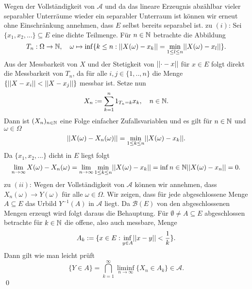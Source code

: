 \begin{proof*}
    Wegen der Vollständigkeit von $\mathcal{A}$ und da das lineare Erzeugnis abzählbar vieler separabler Unterräume wieder ein separabler Unterraum ist können wir erneut ohne Einschränkung annehmen, dass $E$ selbst bereits separabel ist.
    \newline 
    zu $(i)$:
    Sei $\{x_1,x_2,... \} \subseteq E$ eine dichte Teilmenge. Für $n \in \mathbb{N}$ betrachte die Abbildung
    $$
        T_n: \Omega \to \mathbb{N}, \quad \omega \mapsto \inf\{k \leq n: \lvert\lvert X(\omega)-x_k \rvert\rvert = \min_{1\leq l \leq n}\lvert\lvert X(\omega)-x_l \rvert\rvert\}.
    $$ 
    Aus der Messbarkeit von $X$ und der Stetigkeit von $\lvert\lvert \cdot - x \rvert\rvert$ für $x \in E$ folgt direkt die Messbarkeit von $T_n$,
    da für alle $i,j \in \{1,..,n\}$ die Menge $\{\lvert\lvert X - x_i \rvert\rvert < \lvert\lvert X - x_j \rvert\rvert\}$ messbar ist. Setze nun
    $$
        X_n := \sum_{k=1}^n 1_{T_n = k}x_k, \quad n \in \mathbb{N}.
    $$
    Dann ist $(X_n)_{n \in \mathbb{N}}$ eine Folge einfacher Zufallsvariablen und es gilt für $n \in \mathbb{N}$ und $\omega \in \Omega$
    $$
        \lvert\lvert X(\omega)-X_n(\omega) \rvert\rvert = \min_{1\leq k \leq n}\lvert\lvert X(\omega)-x_k \rvert\rvert.
    $$
    Da $\{x_1,x_2,...\}$ dicht in $E$ liegt folgt 
    $$
        \lim_{n \to \infty}{X(\omega) - X_n(\omega)} = \lim_{n \to \infty}\min_{1\leq k \leq n}\lvert\lvert X(\omega)- x_k \rvert\rvert = \inf{n \in \mathbb{N}} \lvert\lvert X(\omega)- x_n \rvert\rvert = 0. 
    $$
    zu $(ii)$: Wegen der Vollständigkeit von $\mathcal{A}$ können wir annehmen, dass $X_n(\omega) \to Y(\omega)$ für alle $\omega \in \Omega$. 
    Wir zeigen, dass für jede abgeschlossene Menge $A \subseteq E$ das Urbild $Y^{-1}(A)$ in $\mathcal{A}$ liegt. 
    Da $\mathcal{B}(E)$ von den abgeschlossenen Mengen erzeugt wird folgt daraus die Behauptung. 
    Für $\emptyset \neq A \subseteq E$ abgeschlossen betrachte für $k \in \mathbb{N}$ die offene, also auch messbare, Menge 
    $$
        A_k := \{x \in E: \inf_{y\in A}\lvert\lvert x-y \rvert\rvert < \frac{1}{k}\}.
    $$
    Dann gilt wie man leicht prüft
    $$
        \{Y \in A\} = \bigcap_{k=1}^{\infty}\liminf_{n \to \infty}\{X_n \in A_k\} \in \mathcal{A}. 
    $$
    \qed 

\end{proof*}

